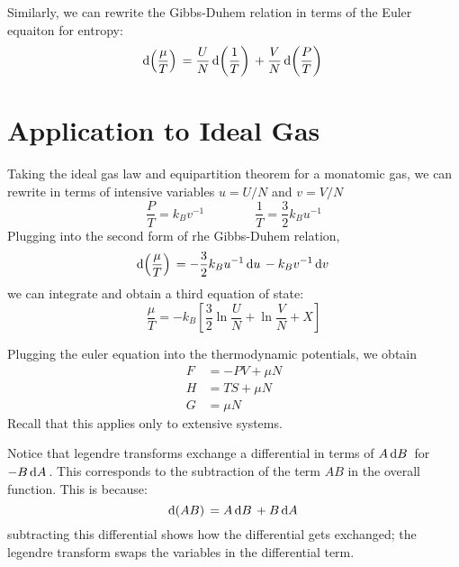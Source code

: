 Similarly, we can rewrite the Gibbs-Duhem relation in terms of the Euler equaiton for entropy:
\begin{equation}
	\d{\left(\frac{\mu}{T}\right)}=\frac{U}{N}\d{\left(\frac{1}{T}\right)}+ \frac{V}{N}\d{\left(\frac{P}{T}\right)}
\end{equation}

\section{Application to Ideal Gas}
Taking the ideal gas law and equipartition theorem for a monatomic gas, we can rewrite in terms of intensive variables \(u=U/N\) and \(v=V/N\)
\[\frac{P}{T}=k_B v^{-1}\qquad \qquad \frac{1}{T}=\frac{3}{2}k_B u^{-1}\]
Plugging into the second form of rhe Gibbs-Duhem relation,
\[\d{\left(\frac{\mu}{T}\right)}=-\frac{3}{2}k_B u^{-1}\d{u}-k_Bv^{-1}\d{v}\]
we can integrate and obtain a third equation of state:
\begin{equation}
	\frac{\mu}{T}=-k_B\left[\frac{3}{2}\ln\frac{U}{N}+\ln\frac{V}{N}+X\right]
\end{equation}

Plugging the euler equation into the thermodynamic potentials, we obtain
\begin{subequations}
	\begin{align}
		F&=-PV+\mu N\\
		H&=TS+\mu N\\
		G&=\mu N
	\end{align}
\end{subequations}
Recall that this applies only to extensive systems.

\begin{aside}
	Notice that legendre transforms exchange a differential in terms of \(A\d{B}\) for \(-B\d{A}\). This corresponds to the subtraction of the term \(AB\) in the overall function. This is because:
	\[\d{(AB)} = A\d{B}+B\d{A}\]
	subtracting this differential shows how the differential gets exchanged; the legendre transform swaps the variables in the differential term.
	
\end{aside}

